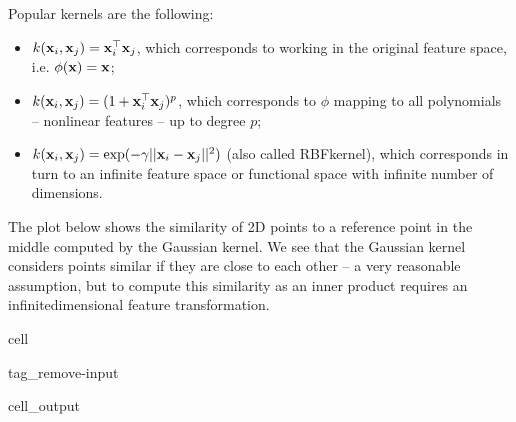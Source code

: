 \documentclass[letterpaper,10pt,english]{jupyterBook}
\begin{document}
\sphinxAtStartPar
Popular kernels are the following:
\begin{itemize}
\item {} 
\sphinxAtStartPar
{} \( k({\bf x}_{i}, {\bf x}_{j}) = {\bf x}_{i}^\top {\bf x}_{j} \), which corresponds to working in the original feature space, i.e. \( \phi({\bf x}) = {\bf x} \);

\item {} 
\sphinxAtStartPar
{} \( k({\bf x}_{i}, {\bf x}_{j}) = (1 + {\bf x}_{i}^\top {\bf x}_{j})^{p}\), which corresponds to \(\phi\) mapping to all polynomials – non\sphinxhyphen{}linear features – up to degree \(p\);

\item {} 
\sphinxAtStartPar
{} \( k({\bf x}_{i}, {\bf x}_{j}) = \exp(-\gamma || {\bf x}_{i} - {\bf x}_{j} ||^{2}) \) (also called RBF\sphinxhyphen{}kernel), which corresponds in turn to an infinite feature space or functional space with infinite number of dimensions.

\end{itemize}

\sphinxAtStartPar
The plot below shows the similarity of 2D points to a reference point in the middle computed by the Gaussian kernel. We see that the Gaussian kernel considers points similar if they are close to each other – a very reasonable assumption, but to compute this similarity as an inner product requires an infinite\sphinxhyphen{}dimensional feature transformation.

\begin{sphinxuseclass}{cell}
\begin{sphinxuseclass}{tag_remove-input}\begin{sphinxVerbatimOutput}

\begin{sphinxuseclass}{cell_output}
\noindent{}

\end{sphinxuseclass}\end{sphinxVerbatimOutput}

\end{sphinxuseclass}
\end{sphinxuseclass}
\end{document}
